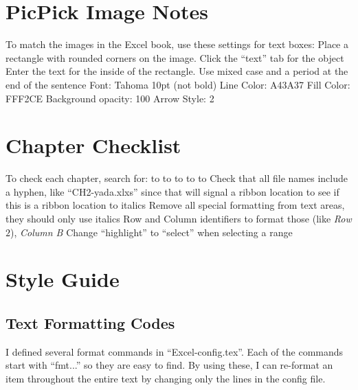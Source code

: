 \begin{enumerate}[resume]
\section{PicPick Image Notes}
To match the images in the Excel book, use these settings for text boxes:
Place a rectangle with rounded corners on the image.
Click the ``text'' tab for the object
Enter the text for the inside of the rectangle. Use mixed case and a period at the end of the sentence
Font: Tahoma 10pt (not bold)
Line Color: A43A37
Fill Color: FFF2CE
Background opacity: 100%
Arrow Style: 2


\section{Chapter Checklist}

To check each chapter, search for:
\fmtPopupButton to \fmtButton
\fmtWorksheetName to \fmtWorksheet
\fmtWorkbookName to \fmtWorksheet
\fmtCellLocation to \fmtLoc
\fmtRibbonButton to \fmtButton
Check that all file names include a hyphen, like ``CH2-yada.xlxs''
\fmtRibbonGroup since that will signal a ribbon location
\fmtRibbonTab to see if this is a ribbon location
\fmtPopupBox to italics
Remove all special formatting from text areas, they should only use italics
Row and Column identifiers to format those (like \textit{Row} $ 2 $), \textit{Column B}
Change ``highlight'' to ``select'' when selecting a range

\section{Style Guide}

\subsection{Text Formatting Codes}
I defined several format commands in ``Excel-config.tex''. Each of the commands start with ``fmt...'' so they are easy to find. By using these, I can re-format an item throughout the entire text by changing only the lines in the config file.


\end{enumerate}
